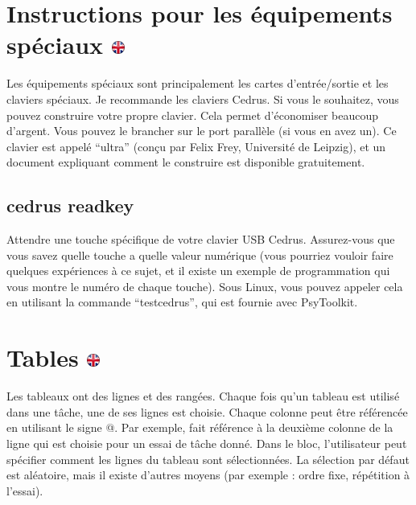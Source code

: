 \documentclass[
]{book}
\begin{document}
\hypertarget{instructions-pour-les-uxe9quipements-spuxe9ciaux}{%
\section[Instructions pour les équipements spéciaux ]{\texorpdfstring{Instructions pour les équipements spéciaux \href{https://www.psytoolkit.org/doc3.2.0/syntax.html\#_instructions_for_special_equipment}{\protect\includegraphics{img/ukflag.png}}}{Instructions pour les équipements spéciaux }}\label{instructions-pour-les-uxe9quipements-spuxe9ciaux}}

Les équipements spéciaux sont principalement les cartes d'entrée/sortie et les claviers spéciaux. Je recommande les claviers Cedrus. Si vous le souhaitez, vous pouvez construire votre propre clavier. Cela permet d'économiser beaucoup d'argent. Vous pouvez le brancher sur le port parallèle (si vous en avez un). Ce clavier est appelé ``ultra'' (conçu par Felix Frey, Université de Leipzig), et un document expliquant comment le construire est disponible gratuitement.

\hypertarget{cedrusreadkey}{%
\subsection{cedrus readkey}\label{cedrusreadkey}}

Attendre une touche spécifique de votre clavier USB Cedrus. Assurez-vous que vous savez quelle touche a quelle valeur numérique (vous pourriez vouloir faire quelques expériences à ce sujet, et il existe un exemple de programmation qui vous montre le numéro de chaque touche). Sous Linux, vous pouvez appeler cela en utilisant la commande ``testcedrus'', qui est fournie avec PsyToolkit.

\hypertarget{tables}{%
\section[Tables ]{\texorpdfstring{Tables \href{https://www.psytoolkit.org/doc3.2.0/syntax.html\#table}{\protect\includegraphics{img/ukflag.png}}}{Tables }}\label{tables}}

Les tableaux ont des lignes et des rangées. Chaque fois qu'un tableau est utilisé dans une tâche, une de ses lignes est choisie. Chaque colonne peut être référencée en utilisant le signe @. Par exemple, \citet{2} fait référence à la deuxième colonne de la ligne qui est choisie pour un essai de tâche donné. Dans le bloc, l'utilisateur peut spécifier comment les lignes du tableau sont sélectionnées. La sélection par défaut est aléatoire, mais il existe d'autres moyens (par exemple : ordre fixe, répétition à l'essai).
\end{document}
